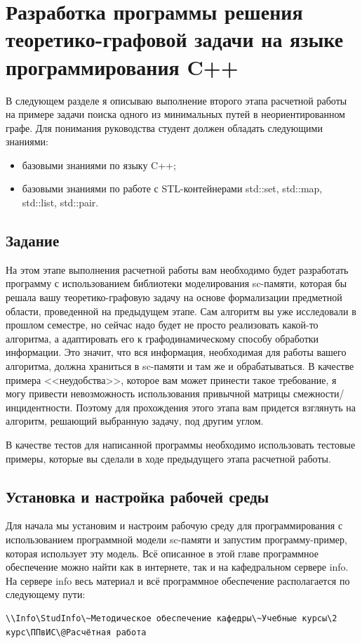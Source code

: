 
\chapter{Разработка программы решения теоретико-графовой задачи на
  языке программирования C++}

В следующем разделе я описываю выполнение второго этапа расчетной
работы на примере задачи поиска одного из минимальных путей в
неориентированном графе. Для понимания руководства студент должен
обладать следующими знаниями:

\begin{itemize}
\item базовыми знаниями по языку C++;
\item базовыми знаниями по работе с STL-контейнерами std::set,
  std::map, std::list, std::pair.
\end{itemize}

\section{Задание}

На этом этапе выполнения расчетной работы вам необходимо будет
разработать программу с использованием библиотеки моделирования
sc-памяти, которая бы решала вашу теоретико-графовую задачу на основе
формализации предметной области, проведенной на предыдущем этапе. Сам
алгоритм вы уже исследовали в прошлом семестре, но сейчас надо будет
не просто реализовать какой-то алгоритма, а адаптировать его к
графодинамическому способу обработки информации. Это значит, что вся
информация, необходимая для работы вашего алгоритма, должна храниться
в sc-памяти и там же и обрабатываться. В качестве примера
<<неудобства>>, которое вам может принести такое требование, я могу
привести невозможность использования привычной матрицы
смежности/инцидентности.  Поэтому для прохождения этого этапа вам
придется взглянуть на алгоритм, решающий выбранную задачу, под другим
углом.

В качестве тестов для написанной программы необходимо использовать
тестовые примеры, которые вы сделали в ходе предыдущего этапа
расчетной работы.

\section{Установка и настройка рабочей среды}

Для начала мы установим и настроим рабочую среду для программирования
с использованием программной модели sc-памяти и запустим
программу-пример, которая использует эту модель. Всё описанное в этой
главе программное обеспечение можно найти как в интернете, так и на
кафедральном сервере info. На сервере info весь материал и всё
программное обеспечение располагается по следующему пути:
\begin{verbatim}
\\Info\StudInfo\~Методическое обеспечение кафедры\~Учебные курсы\2 курс\ППвИС\@Расчётная работа
\end{verbatim}

